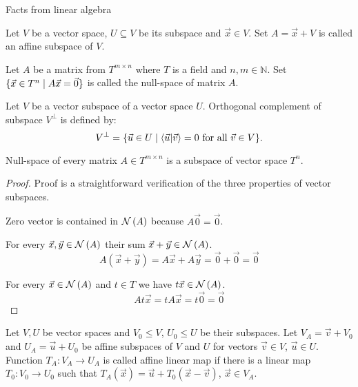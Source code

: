 \begin{chapter}{Facts from linear algebra}
\begin{definition}
Let $V$ be a vector space, $U \subseteq V$ be its subspace and $\vec{x} \in V$. Set $A = \vec{x} + V$ is called an affine subspace of $V$.
\end{definition}

\begin{definition}
Let $A$ be a matrix from $T ^ {m \times n}$ where $T$ is a field and $n, m \in \mathbb{N}$. Set $\{ \vec{x} \in T^{n} \mid A\vec{x} = \vec{0} \}$ is called the null-space of matrix $A$.
\end{definition}

\begin{definition}
Let $V$ be a vector subspace of a vector space $U$. Orthogonal complement of subspace $V ^ {\bot}$ is defined by:
\[
	V ^ {\bot} = \{ \vec{u} \in U \mid \langle \vec{u} | \vec{v} \rangle = 0 \text{ for all } \vec{v} \in V \} \text{.}
\]
\end{definition}

\begin{remark}
Null-space of every matrix $A \in T ^ {m \times n}$ is a subspace of vector space $T^{n}$.
\end{remark}
\begin{proof}
Proof is a straightforward verification of the three properties of vector subspaces.

Zero vector is contained in $\mathcal{N}\left({A}\right)$ because $A\vec{0} = \vec{0}$.

For every $\vec{x}, \vec{y} \in \mathcal{N}\left({A}\right)$ their sum $\vec{x} + \vec{y} \in \mathcal{N}\left({A}\right)$.
\[
	A(\vec{x} + \vec{y}) = A\vec{x} + A\vec{y} = \vec{0} + \vec{0} = \vec{0}
\]

For every $\vec{x} \in \mathcal{N}\left({A}\right)$ and $t \in T$ we have $t \vec{x} \in \mathcal{N}\left({A}\right)$.
\[
	At\vec{x} = tA\vec{x} = t\vec{0} = \vec{0}
\]
\end{proof}

\begin{definition}
Let $V, U$ be vector spaces and $V_0 \leq V$, $U_0 \leq U$ be their subspaces. Let $V_A = \vec{v} + V_0$ and $U_A = \vec{u} + U_0$ be affine subspaces of $V$ and $U$ for vectors $\vec{v} \in V$, $\vec{u} \in U$. Function $T_A: V_A \rightarrow U_A$ is called affine linear map if there is a linear map $T_0: V_0 \rightarrow U_0$ such that $T_A(\vec{x}) = \vec{u} + T_0(\vec{x} - \vec{v})$, $\vec{x} \in V_A$.
\end{definition}


\end{chapter}
